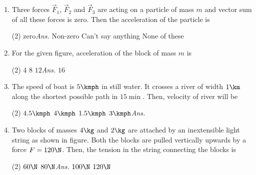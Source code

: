 \documentclass{article}
\newcommand{\ans}{\textcolor{red!95}{\textit{\quad Ans.}}}
\begin{document}
\begin{enumerate}
	\item Three forces $\vec{F}_1$, $\vec{F}_2$ and $\vec{F}_3$ are acting on a particle of mass $m$ and vector sum of all these forces is zero. Then the acceleration of the particle is
	\begin{center}
	\end{center}
	\begin{tasks}(2)
		\task zero\ans
		\task Non-zero
		\task Can't say anything
		\task None of these
	\end{tasks}
	
	\item For the given figure, acceleration of the block of mass $m$ is
	\begin{center}
	\end{center}
	\begin{tasks}(2)
		\task $4$
		\task $8$
		\task $12$\ans
		\task $16$
	\end{tasks}
	
\item The speed of boat is $5\kmph$ in still water. It crosses a river of width $1\km$ along the shortest possible path in $15\min$. Then, velocity of river will be
\begin{tasks}(2)
    \task $4.5\kmph$
    \task $4\kmph$
    \task $1.5\kmph$
    \task $3\kmph$\ans
\end{tasks}	



\item Two blocks of masses $4 \kg$ and $2 \kg$ are attached by an inextensible light string as shown in figure. Both the blocks are pulled vertically upwards by a force $F = 120 \N$. Then, the tension in the string connecting the blocks is
\begin{center}
\end{center} 
\begin{tasks}(2)
	\task $60\N$
	\task $80\N$\ans
	\task $100\N$
	\task $120\N$
\end{tasks}


\end{enumerate}
\end{document}
